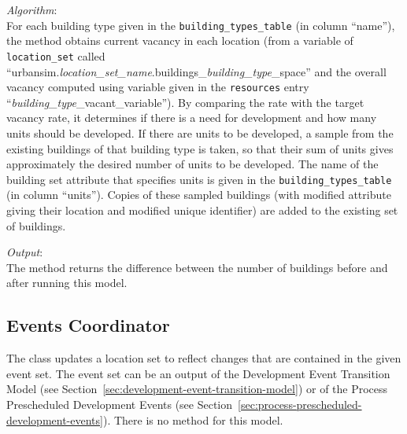 {\it Algorithm}:~\\[1mm]
For each building type given in
the \verb|building_types_table| (in column ``name''), the method obtains current vacancy in each
location (from a variable of \verb|location_set| called 
``urbansim.{\it location_set_name}.buildings_{\it building_type}_space'' and the overall vacancy computed 
using variable given in the \verb|resources| entry ``{\it building_type}_vacant_variable''). By comparing
the rate with the target vacancy rate, it determines if there is a need for
development and how many units should be developed. If there are units to be
developed, a sample from the existing buildings of that building type is taken, so that their
sum of units gives approximately the desired number of units to be developed. 
The name of the building set attribute that specifies units is given in the \verb|building_types_table| 
(in column ``units''). Copies of these sampled buildings (with modified attribute giving their location
and modified unique identifier) 
are added to the existing set of buildings.

{\it Output}:~\\[1mm]
The method returns the difference between the number of buildings before and after running this model.


%
\subsection{Events Coordinator}
%
\label{sec:events-coordinator}
%
The class  updates a location set to reflect changes
that are contained in the given event set. The event set can be an output of the Development Event Transition Model
(see Section~\ref{sec:development-event-transition-model})
or of the Process Prescheduled Development Events (see Section~\ref{sec:process-prescheduled-development-events}). 
There is no  method for this model. 
%
